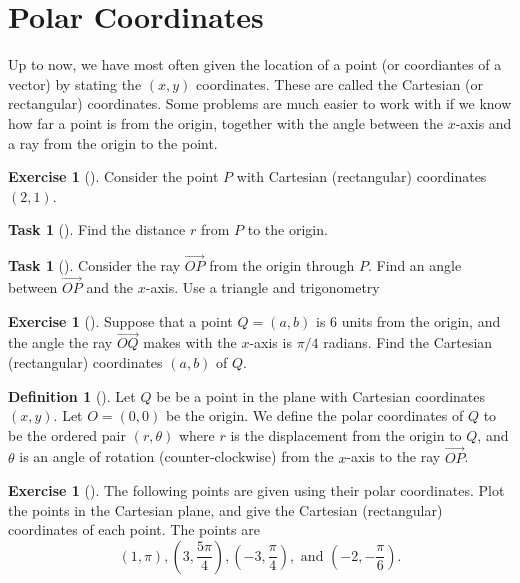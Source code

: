 \documentclass[10pt,]{book}
\theoremstyle{plain}
\theoremstyle{definition}
\newtheorem{definition}[theorem]{Definition}
\theoremstyle{definition}
\theoremstyle{definition}
\theoremstyle{definition}
\newtheorem{exploration}[project]{Exercise}
\newtheorem{task}[project]{Task}
\theoremstyle{definition}
\numberwithin{equation}{section}
\newcommand{\ds}{\displaystyle}
\begin{document}
\section[{Polar Coordinates}]{Polar Coordinates}\label{section-13}
Up to now, we have most often given the location of a point (or coordiantes of a vector) by stating the \((x,y)\) coordinates. These are called the Cartesian (or rectangular) coordinates. Some problems are much easier to work with if we know how far a point is from the origin, together with the angle between the \(x\)-axis and a ray from the origin to the point.%
\begin{exploration}[]\label{exploration-83}
Consider the point \(P\) with Cartesian (rectangular) coordinates \((2,1)\).%
\begin{task}[]\label{task-138}
Find the distance \(r\) from \(P\) to the origin.%
\end{task}
\begin{task}[]\label{task-139}
Consider the ray \(\stackrel{\rightarrow}{OP}\) from the origin through \(P\). Find an angle between \(\vec{OP}\) and the \(x\)-axis. Use a triangle and trigonometry%
%
\end{task}
\end{exploration}
\begin{exploration}[]\label{exploration-84}
Suppose that a point \(Q=(a,b)\) is 6 units from the origin, and the angle the ray \(\vec{OQ}\) makes with the \(x\)-axis is \(\pi/4\) radians. Find the Cartesian (rectangular) coordinates \((a,b)\) of \(Q\).%
\end{exploration}
\begin{definition}[{}]\label{definition-21}
Let \(Q\) be be a point in the plane with Cartesian coordinates \((x,y)\). Let \(O=(0,0)\) be the origin. We define the polar coordinates of \(Q\) to be the ordered pair \((r,\theta)\) where \(r\) is the displacement from the origin to \(Q\), and \(\theta\) is an angle of rotation (counter-clockwise) from the \(x\)-axis to the ray \(\vec {OP}\).%
\end{definition}
\begin{exploration}[]\label{exploration-85}
The following points are given using their polar coordinates. Plot the points in the Cartesian plane, and give the Cartesian (rectangular) coordinates of each point. The points are%
\begin{equation*}
(1,\pi), 
\ds \left( 3,\frac{5\pi}{4}\right),
\ds \left( -3,\frac{\pi}{4}\right),\text{ and } 
\ds \left( -2,-\frac{\pi}{6}\right).
\end{equation*}
%
\end{exploration}
\end{document}
